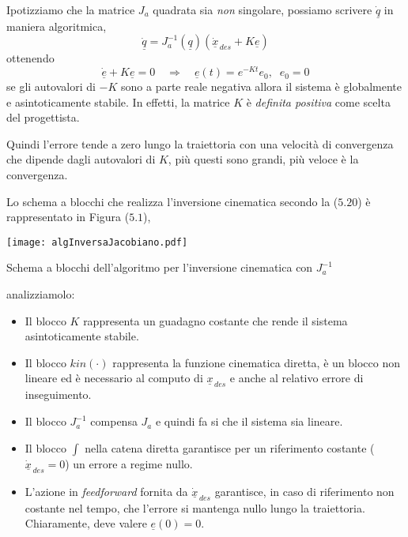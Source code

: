 \paragraph{}
Ipotizziamo che la matrice $J_a$ quadrata sia \emph{non} singolare, possiamo scrivere $\underline{\dot{q}}$ in maniera algoritmica,
\begin{equation}
	\underline{\dot{q}} = J_a^{-1}(\underline{q})(\underline{\dot{x}}_{\,des} + K\underline{e})
\end{equation}
ottenendo 
\begin{equation}
	\underline{\dot{e}} + K\underline{e} = 0 \quad \Rightarrow \quad \underline{e}(t) = e^{-Kt}e_0,\;\; e_0 = 0
\end{equation}
se gli autovalori di $-K$ sono a parte reale negativa allora il sistema è globalmente e asintoticamente stabile. In effetti, la matrice $K$ è \emph{definita positiva} come scelta del progettista. 

Quindi l'errore tende a zero lungo la traiettoria con una velocità di convergenza che dipende dagli autovalori di $K$, più questi sono grandi, più veloce è la convergenza.

Lo schema a blocchi che realizza l'inversione cinematica secondo la ($5.20$) è rappresentato in Figura ($5.1$), 
\begin{center}
	\texttt{[image: algInversaJacobiano.pdf]}
	\caption{Schema a blocchi dell'algoritmo per l'inversione cinematica con $J_a^{-1}$}
\end{center}
analizziamolo:
\begin{itemize}
	\item Il blocco $K$ rappresenta un guadagno costante che rende il sistema asintoticamente stabile.
	\item Il blocco $kin(\cdot)$ rappresenta la funzione cinematica diretta, è un blocco non lineare ed è necessario al computo di $\underline{x}_{\,des}$ e anche al relativo errore di inseguimento.
	\item Il blocco $J_a^{-1}$ compensa $J_a$ e quindi fa si che il sistema sia lineare.
	\item Il blocco $\int$ nella catena diretta garantisce per un riferimento costante ($\underline{\dot{x}}_{\,des} = 0$) un errore a regime nullo.
	\item L'azione in \emph{feedforward} fornita da $\underline{\dot{x}}_{\,des}$ garantisce, in caso di riferimento non costante nel tempo, che l'errore si mantenga nullo lungo la traiettoria. Chiaramente, deve valere $\underline{e}(0) = 0$. 
\end{itemize}
